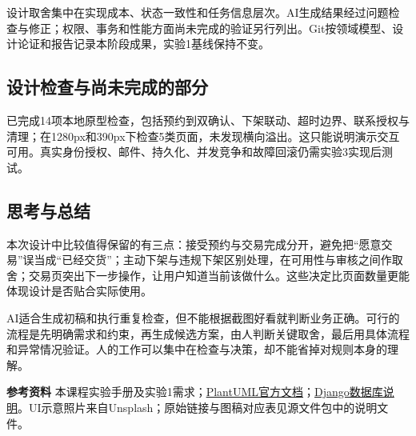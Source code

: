 \documentclass[UTF8,a4paper,zihao=5,fontset=fandol]{ctexart}
\begin{document}
设计取舍集中在实现成本、状态一致性和任务信息层次。AI生成结果经过问题检查与修正；权限、事务和性能方面尚未完成的验证另行列出。Git按领域模型、设计论证和报告记录本阶段成果，实验1基线保持不变。

\subsection{设计检查与尚未完成的部分}
已完成14项本地原型检查，包括预约到双确认、下架联动、超时边界、联系授权与清理；在1280px和390px下检查5类页面，未发现横向溢出。这只能说明演示交互可用。真实身份授权、邮件、持久化、并发竞争和故障回滚仍需实验3实现后测试。

\subsection{思考与总结}
本次设计中比较值得保留的有三点：接受预约与交易完成分开，避免把“愿意交易”误当成“已经交货”；主动下架与违规下架区别处理，在可用性与审核之间作取舍；交易页突出下一步操作，让用户知道当前该做什么。这些决定比页面数量更能体现设计是否贴合实际使用。

AI适合生成初稿和执行重复检查，但不能根据截图好看就判断业务正确。可行的流程是先明确需求和约束，再生成候选方案，由人判断关键取舍，最后用具体流程和异常情况验证。人的工作可以集中在检查与决策，却不能省掉对规则本身的理解。

\vspace{1mm}
\noindent\textbf{参考资料}\quad
本课程实验手册及实验1需求；\href{https://plantuml.com/}{PlantUML官方文档}；\href{https://docs.djangoproject.com/en/5.2/ref/databases/}{Django数据库说明}。UI示意照片来自Unsplash；原始链接与图稿对应表见源文件包中的说明文件。
\end{document}
